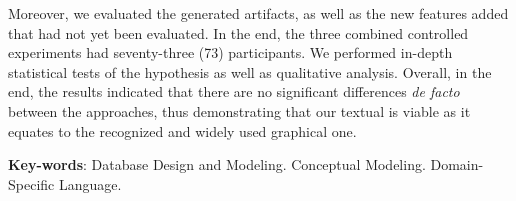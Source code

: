 \begin{resumo}[Abstract]
Moreover, we evaluated the generated artifacts, as well as the new features added that had not yet been evaluated. 
In the end, the three combined controlled experiments had seventy-three (73) participants. 
We performed in-depth statistical tests of the hypothesis as well as qualitative analysis.
Overall, in the end, the results indicated that there are no significant differences \textit{de facto} between the approaches, thus demonstrating that our textual is viable as it equates to the recognized and widely used graphical one.

\vspace{\onelineskip}

 \noindent 
 \textbf{Key-words}: Database Design and Modeling. Conceptual Modeling. Domain-Specific Language.
\end{resumo}